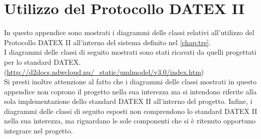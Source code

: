 \chapter{Utilizzo del Protocollo DATEX II}
\label{app:a}
In questo appendice sono mostrati  i diagrammi delle classi relativi all'utilizzo del Protocollo DATEX II all'interno del sistema definito nel \autoref{chap:tre}.\\
I diagrammi delle classi di seguito mostrati sono stati ricavati da quelli progettati per lo standard DATEX. (\url{http://d2docs.ndwcloud.nu/_static/umlmodel/v3.0/index.htm})\\
Si presti inoltre attenzione al fatto che i diagrammi delle classi mostrati in questo appendice non coprono il progetto nella sua interezza ma si intendono riferite alla sola implementazione dello standard DATEX II all'interno del progetto.
Infine, i diagrammi delle classi di seguito esposti non comprendono lo standard DATEX II nella sua interezza, ma riguardano le sole componenti che si è ritenuto opportuno integrare nel progetto.\\
